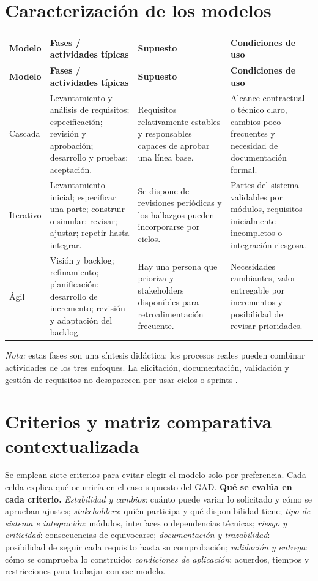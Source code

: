 \documentclass[10pt,a4paper,onecolumn]{IEEEtran}
\begin{document}
\section{Caracterización de los modelos}
\small
\begin{longtable}{@{}p{2.0cm}p{5.25cm}p{3.3cm}p{5.55cm}@{}}
\toprule
\textbf{Modelo} & \textbf{Fases / actividades típicas} & \textbf{Supuesto} & \textbf{Condiciones de uso}\\
\midrule\endfirsthead
\toprule
\textbf{Modelo} & \textbf{Fases / actividades típicas} & \textbf{Supuesto} & \textbf{Condiciones de uso}\\\midrule\endhead
Cascada & Levantamiento y análisis de requisitos; especificación; revisión y aprobación; desarrollo y pruebas; aceptación. & Requisitos relativamente estables y responsables capaces de aprobar una línea base. & Alcance contractual o técnico claro, cambios poco frecuentes y necesidad de documentación formal. \\
\midrule
Iterativo & Levantamiento inicial; especificar una parte; construir o simular; revisar; ajustar; repetir hasta integrar. & Se dispone de revisiones periódicas y los hallazgos pueden incorporarse por ciclos. & Partes del sistema validables por módulos, requisitos inicialmente incompletos o integración riesgosa. \\
\midrule
Ágil & Visión y backlog; refinamiento; planificación; desarrollo de incremento; revisión y adaptación del backlog. & Hay una persona que prioriza y stakeholders disponibles para retroalimentación frecuente. & Necesidades cambiantes, valor entregable por incrementos y posibilidad de revisar prioridades. \\
\midrule
\end{longtable}
\normalsize
\textit{Nota:} estas fases son una síntesis didáctica; los procesos reales pueden combinar actividades de los tres enfoques. La elicitación, documentación, validación y gestión de requisitos no desaparecen por usar ciclos o sprints \cite{ireb2026}.

\section{Criterios y matriz comparativa contextualizada}
Se emplean siete criterios para evitar elegir el modelo solo por preferencia. Cada celda explica qué ocurriría en el caso supuesto del GAD.
\textbf{Qué se evalúa en cada criterio.} 
\emph{Estabilidad y cambios}: cuánto puede variar lo solicitado y cómo se aprueban ajustes; 
\emph{stakeholders}: quién participa y qué disponibilidad tiene; 
\emph{tipo de sistema e integración}: módulos, interfaces o dependencias técnicas; 
\emph{riesgo y criticidad}: consecuencias de equivocarse; 
\emph{documentación y trazabilidad}: posibilidad de seguir cada requisito hasta su comprobación; 
\emph{validación y entrega}: cómo se comprueba lo construido; 
\emph{condiciones de aplicación}: acuerdos, tiempos y restricciones para trabajar con ese modelo.
\end{document}
